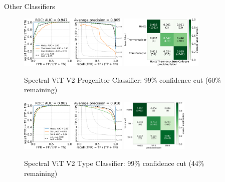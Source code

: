 \begin{frame}{Other Classifiers}
    \begin{figure}
        \centering
        \includegraphics[height=2.5cm]{figures/Presentation/v2/vit_model_V2roc99_proj_e26.png}
        \quad
        \includegraphics[height=2.5cm]{figures/Presentation/v2/vit_model_V2cm99_proj_e26.png}
        \caption{Spectral ViT V2 Progenitor Classifier: 99\% confidence cut (60\% remaining)\label{fig:v2_99_proj_qual}}
        \includegraphics[height=2.5cm]{figures/Presentation/v2/vit_model_V2roc99_type_e26.png}
        \quad
        \includegraphics[height=2.5cm]{figures/Presentation/v2/vit_model_V2cm99_type_e26.png}
        \caption{Spectral ViT V2 Type Classifier: 99\% confidence cut (44\% remaining)\label{fig:v2_99_type_qual}}
    \end{figure}
\end{frame}






